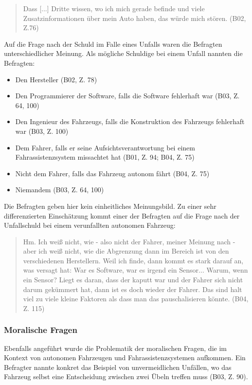 \documentclass[12pt]{article}
\begin{document}
\begin{quote}
  Dass [...] Dritte wissen, wo ich mich gerade befinde und viele Zusatzinformationen über mein Auto haben, das würde mich stören. (B02, Z.76)
\end{quote}

Auf die Frage nach der Schuld im Falle eines Unfalls waren die Befragten unterschiedlicher Meinung. Als mögliche Schuldige bei einem Unfall nannten die Befragten:
\begin{itemize}
  \item Den Hersteller (B02, Z. 78)
  \item Den Programmierer der Software, falls die Software fehlerhaft war (B03, Z. 64, 100)
  \item Den Ingenieur des Fahrzeugs, falls die Konstruktion des Fahrzeugs fehlerhaft war (B03, Z. 100)
  \item Dem Fahrer, falls er seine Aufsichtsverantwortung bei einem Fahrassistenzsystem missachtet hat (B01, Z. 94; B04, Z. 75)
  \item Nicht dem Fahrer, falls das Fahrzeug autonom fährt (B04, Z. 75)
  \item Niemandem (B03, Z. 64, 100)
\end{itemize}

Die Befragten geben hier kein einheitliches Meinungsbild. Zu einer sehr differenzierten Einschätzung kommt einer der Befragten auf die Frage nach der Unfallschuld bei einem verunfallten autonomen Fahrzeug:

\begin{quote}
  Hm. Ich weiß nicht, wie - also nicht der Fahrer, meiner Meinung nach - aber ich weiß nicht, wie die Abgrenzung dann im Bereich ist von den verschiedenen Herstellern. Weil ich finde, dann kommt es stark darauf an, was versagt hat: War es Software, war es irgend ein Sensor... Warum, wenn ein Sensor? Liegt es daran, dass der kaputt war und der Fahrer sich nicht darum gekümmert hat, dann ist es doch wieder der Fahrer. Das sind halt viel zu viele kleine Faktoren als dass man das pauschalisieren könnte. (B04, Z. 115)
\end{quote}

\subsubsection*{Moralische Fragen}
Ebenfalls angeführt wurde die Problematik der moralischen Fragen, die im Kontext von autonomen Fahrzeugen und Fahrassistenzsystemen aufkommen. Ein Befragter nannte konkret das Beispiel von unvermeidlichen Unfällen, wo das Fahrzeug selbst eine Entscheidung zwischen zwei Übeln treffen muss (B03, Z. 90).
\end{document}
